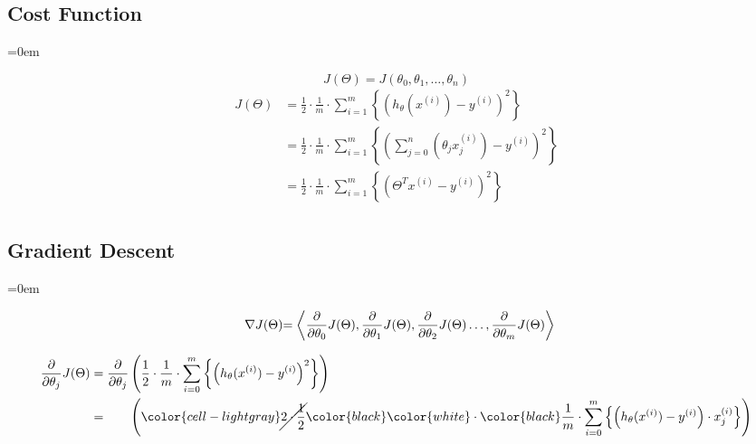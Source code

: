 \subsubsectionend

\subsectionend
\subsection{Cost Function}
\label{ssec:cost_function}
\parindent=0em

\[
	J(\Theta) = J(\theta_0 , \theta_1 , \ldots , \theta_n)
\]
\[
\begin{aligned}
	J(\Theta)
	& = 
	\frac{1}{2}
	\cdot \frac{1}{m}
	\cdot \sum_{i=1}^{m} \left\{
		\left(
			h_{\theta}(x^{(i)}) - y^{(i)}
		\right)^{2}
	\right\}
	\\
	& =
	\frac{1}{2}
	\cdot \frac{1}{m}
	\cdot \sum_{i=1}^{m} \left\{
		\left(
		\sum_{j=0}^{n} \left(
			\theta_{j}x_{j}^{(i)}
		\right)
	- y^{(i)}
	\right)^{2}
	\right\}
	\\
	& =
	\frac{1}{2}
	\cdot \frac{1}{m}
	\cdot \sum_{i=1}^{m} \left\{
		\left(
			\Theta^{T}x^{(i)}
	- y^{(i)}
	\right)^{2}
	\right\}
	\\
\end{aligned}
\tag{2}
\]

\subsectionend
\subsection{Gradient Descent}
\label{ssec:gradient_descent}
\parindent=0em

\[
	\begin{array}{ l@{} l@{} }
		\nabla J(\Theta)
		& =
		\left\langle
		  {\displaystyle \frac{\partial}{\partial \theta_0} J(\Theta)}
		, {\displaystyle \frac{\partial}{\partial \theta_1} J(\Theta)}
		, {\displaystyle \frac{\partial}{\partial \theta_2} J(\Theta)}
		\ldots
		, {\displaystyle \frac{\partial}{\partial \theta_m} J(\Theta)}
		\right\rangle
		\\
	\end{array}
\]

\[
\begin{aligned}
	\frac{\partial}{\partial \theta_j}
	J(\Theta)
	& =
	\frac{\partial}{\partial \theta_j}
	\left(
		\frac{1}{2}
		\cdot \frac{1}{m}
		\cdot \sum_{i=0}^{m}
			\left\{
				\left(
					h_{\theta}(x^{(i)}) - y^{(i)}
				\right)^{2}
			\right\}
	\right)
	\\
	& =
	\phantom{\frac{\partial}{\partial \theta_j}}
	\left(
		\color{cell-lightgray}
		\cancel{2
		\cdot 
		\frac{1}{2}}
		\color{black}
		\color{white}\cdot\color{black}
		\frac{1}{m}
		\cdot \sum_{i=0}^{m}
			\left\{
				\left(
					h_{\theta}(x^{(i)}) - y^{(i)}
				\right)
			\cdot x_{j}^{(i)}
			\right\}
	\right)
	\\
\end{aligned}
\]


